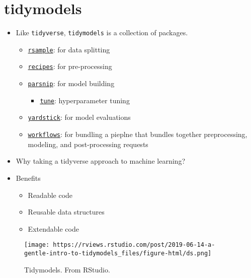 \documentclass[
]{book}
\providecommand{\tightlist}{%
  \setlength{\itemsep}{0pt}\setlength{\parskip}{0pt}}
\begin{document}
\hypertarget{tidymodels}{%
\section{tidymodels}\label{tidymodels}}

\begin{itemize}
\item
  Like \texttt{tidyverse}, \texttt{tidymodels} is a collection of packages.

  \begin{itemize}
  \item
    \href{https://rsample.tidymodels.org/}{\texttt{rsample}}: for data splitting
  \item
    \href{https://recipes.tidymodels.org/index.html}{\texttt{recipes}}: for pre-processing
  \item
    \href{https://www.tidyverse.org/blog/2018/11/parsnip-0-0-1/}{\texttt{parsnip}}: for model building

    \begin{itemize}
    \tightlist
    \item
      \href{https://github.com/tidymodels/tune}{\texttt{tune}}: hyperparameter tuning
    \end{itemize}
  \item
    \href{https://github.com/tidymodels/yardstick}{\texttt{yardstick}}: for model evaluations
  \item
    \href{https://github.com/tidymodels/workflows}{\texttt{workflows}}: for bundling a pieplne that bundles together preprocessing, modeling, and post-processing requests
  \end{itemize}
\item
  Why taking a tidyverse approach to machine learning?
\item
  Benefits

  \begin{itemize}
  \item
    Readable code
  \item
    Reusable data structures
  \item
    Extendable code
  \end{itemize}
\end{itemize}

\begin{figure}
\centering
\texttt{[image: https://rviews.rstudio.com/post/2019-06-14-a-gentle-intro-to-tidymodels\_files/figure-html/ds.png]}
\caption{Tidymodels. From RStudio.}
\end{figure}
\end{document}
